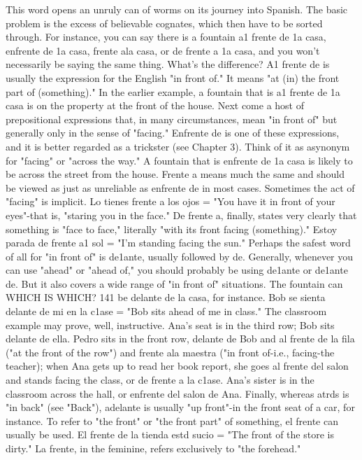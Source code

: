 This word opens an unruly can of worms on its journey into
Spanish. The basic problem is the excess of believable cognates, which
then have to be sorted through. For instance, you can say there is a
fountain a1 frente de 1a casa, enfrente de 1a casa, frente ala casa, or
de frente a 1a casa, and you won't necessarily be saying the same
thing. What's the difference?
A1 frente de is usually the expression for the English "in front
of." It means "at (in) the front part of (something)." In the earlier example, a fountain that is a1 frente de 1a casa is on the property at the
front of the house. Next come a host of prepositional expressions that,
in many circumstances, mean "in front of" but generally only in the
sense of "facing." Enfrente de is one of these expressions, and it is better regarded as a trickster (see Chapter 3). Think of it as asynonym for
"facing" or "across the way." A fountain that is enfrente de 1a casa is
likely to be across the street from the house. Frente a means much the
same and should be viewed as just as unreliable as enfrente de in most
cases. Sometimes the act of "facing" is implicit. Lo tienes frente a los
ojos = "You have it in front of your eyes"-that is, "staring you in the
face." De frente a, finally, states very clearly that something is "face
to face," literally "with its front facing (something)." Estoy parada de
frente a1 sol = "I'm standing facing the sun."
Perhaps the safest word of all for "in front of" is de1ante, usually followed by de. Generally, whenever you can use "ahead" or
"ahead of," you should probably be using de1ante or de1ante de. But it
also covers a wide range of "in front of" situations. The fountain can
WHICH IS WHICH? 141
be delante de la casa, for instance. Bob se sienta delante de mi en la
c1ase = "Bob sits ahead of me in class."
The classroom example may prove, well, instructive. Ana's
seat is in the third row; Bob sits delante de ella. Pedro sits in the front
row, delante de Bob and al frente de la fila ("at the front of the row")
and frente ala maestra ("in front of-i.e., facing-the teacher); when
Ana gets up to read her book report, she goes al frente del salon and
stands facing the class, or de frente a la c1ase. Ana's sister is in the
classroom across the hall, or enfrente del salon de Ana.
Finally, whereas atrds is "in back" (see "Back"), adelante is
usually "up front"-in the front seat of a car, for instance. To refer to
"the front" or "the front part" of something, el frente can usually be
used. El frente de la tienda estd sucio = "The front of the store is
dirty." La frente, in the feminine, refers exclusively to "the forehead."

